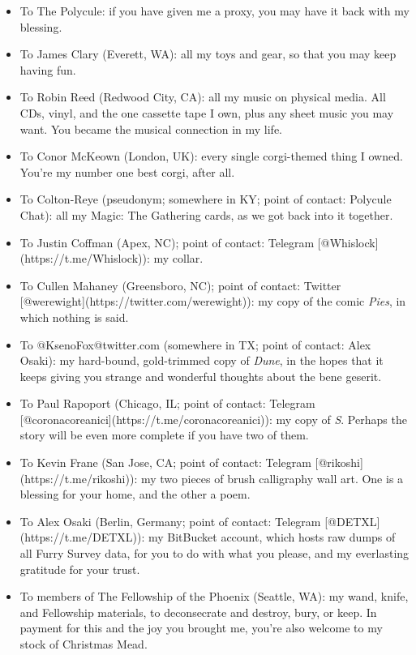 \begin{enumerate}
  \begin{itemize}
  \tightlist
  \item
    To The Polycule: if you have given me a proxy, you may have it back with my blessing.
  \item
    To James Clary (Everett, WA): all my toys and gear, so that you may keep having fun.
  \item
    To Robin Reed (Redwood City, CA): all my music on physical media. All CDs, vinyl, and the one cassette tape I own, plus any sheet music you may want. You became the musical connection in my life.
  \item
    To Conor McKeown (London, UK): every single corgi-themed thing I owned. You're my number one best corgi, after all.
  \item
    To Colton-Reye (pseudonym; somewhere in KY; point of contact: Polycule Chat): all my Magic: The Gathering cards, as we got back into it together.
  \item
    To Justin Coffman (Apex, NC); point of contact: Telegram {[}@Whislock{]}(https://t.me/Whislock)): my collar.
  \item
    To Cullen Mahaney (Greensboro, NC); point of contact: Twitter {[}@werewight{]}(https://twitter.com/werewight)): my copy of the comic \emph{Pies}, in which nothing is said.
  \item
    To @KsenoFox@twitter.com (somewhere in TX; point of contact: Alex Osaki): my hard-bound, gold-trimmed copy of \emph{Dune}, in the hopes that it keeps giving you strange and wonderful thoughts about the bene geserit.
  \item
    To Paul Rapoport (Chicago, IL; point of contact: Telegram {[}@coronacoreanici{]}(https://t.me/coronacoreanici)): my copy of \emph{S}. Perhaps the story will be even more complete if you have two of them.
  \item
    To Kevin Frane (San Jose, CA; point of contact: Telegram {[}@rikoshi{]}(https://t.me/rikoshi)): my two pieces of brush calligraphy wall art. One is a blessing for your home, and the other a poem.
  \item
    To Alex Osaki (Berlin, Germany; point of contact: Telegram {[}@DETXL{]}(https://t.me/DETXL)): my BitBucket account, which hosts raw dumps of all Furry Survey data, for you to do with what you please, and my everlasting gratitude for your trust.
  \item
    To members of The Fellowship of the Phoenix (Seattle, WA): my wand, knife, and Fellowship materials, to deconsecrate and destroy, bury, or keep. In payment for this and the joy you brought me, you're also welcome to my stock of Christmas Mead.
  \end{itemize}
\end{enumerate}

